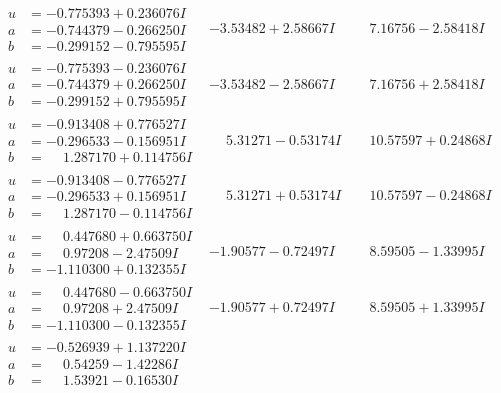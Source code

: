 \documentclass[1p]{elsarticle_modified}
\theoremstyle{definition}
\begin{document}
$$\begin{array}{c|c|c}
\begin{aligned}
u &= -0.775393 + 0.236076 I \\
a &= -0.744379 - 0.266250 I \\
b &= -0.299152 - 0.795595 I\end{aligned}
 & -3.53482 + 2.58667 I & \phantom{-}7.16756 - 2.58418 I \\ \hline\begin{aligned}
u &= -0.775393 - 0.236076 I \\
a &= -0.744379 + 0.266250 I \\
b &= -0.299152 + 0.795595 I\end{aligned}
 & -3.53482 - 2.58667 I & \phantom{-}7.16756 + 2.58418 I \\ \hline\begin{aligned}
u &= -0.913408 + 0.776527 I \\
a &= -0.296533 - 0.156951 I \\
b &= \phantom{-}1.287170 + 0.114756 I\end{aligned}
 & \phantom{-}5.31271 - 0.53174 I & \phantom{-}10.57597 + 0.24868 I \\ \hline\begin{aligned}
u &= -0.913408 - 0.776527 I \\
a &= -0.296533 + 0.156951 I \\
b &= \phantom{-}1.287170 - 0.114756 I\end{aligned}
 & \phantom{-}5.31271 + 0.53174 I & \phantom{-}10.57597 - 0.24868 I \\ \hline\begin{aligned}
u &= \phantom{-}0.447680 + 0.663750 I \\
a &= \phantom{-}0.97208 - 2.47509 I \\
b &= -1.110300 + 0.132355 I\end{aligned}
 & -1.90577 - 0.72497 I & \phantom{-}8.59505 - 1.33995 I \\ \hline\begin{aligned}
u &= \phantom{-}0.447680 - 0.663750 I \\
a &= \phantom{-}0.97208 + 2.47509 I \\
b &= -1.110300 - 0.132355 I\end{aligned}
 & -1.90577 + 0.72497 I & \phantom{-}8.59505 + 1.33995 I \\ \hline\begin{aligned}
u &= -0.526939 + 1.137220 I \\
a &= \phantom{-}0.54259 - 1.42286 I \\
b &= \phantom{-}1.53921 - 0.16530 I\end{aligned}

\end{array}$$
\end{document}
